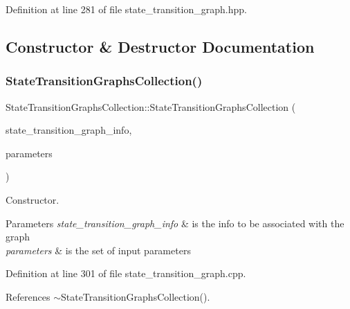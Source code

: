 Definition at line 281 of file state\+\_\+transition\+\_\+graph.\+hpp.



\subsection{Constructor \& Destructor Documentation}
\mbox{\label{classStateTransitionGraphsCollection_a1103b1504905684e153f0a746f8d85be}} 
\subsubsection{\texorpdfstring{State\+Transition\+Graphs\+Collection()}{StateTransitionGraphsCollection()}}
{\footnotesize\ttfamily State\+Transition\+Graphs\+Collection\+::\+State\+Transition\+Graphs\+Collection (\begin{DoxyParamCaption}\item[{const \hyperlink{state__transition__graph_8hpp_ad14dd7263de4e0bad3ad431954ad8252}{State\+Transition\+Graph\+Info\+Ref}}]{state\+\_\+transition\+\_\+graph\+\_\+info,  }\item[{const \hyperlink{Parameter_8hpp_a37841774a6fcb479b597fdf8955eb4ea}{Parameter\+Const\+Ref}}]{parameters }\end{DoxyParamCaption})}



Constructor. 


\begin{DoxyParams}{Parameters}
{\em state\+\_\+transition\+\_\+graph\+\_\+info} & is the info to be associated with the graph \\
\hline
{\em parameters} & is the set of input parameters \\
\hline
\end{DoxyParams}


Definition at line 301 of file state\+\_\+transition\+\_\+graph.\+cpp.



References $\sim$\+State\+Transition\+Graphs\+Collection().

